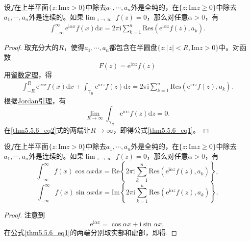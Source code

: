 \documentclass[../../main.tex]{subfiles}
\begin{document}
\begin{theorem}\label{theorem:定理5.5.6}
设$f$在上半平面$\{ z: \mathrm{Im} z > 0 \}$中除去$a_1, \cdots, a_n$外是全纯的，在$\{ z: \mathrm{Im} z \geqslant 0 \}$中除去$a_1, \cdots, a_n$外是连续的。如果$\lim_{\substack{z \to \infty}} f(z) = 0$，那么对任意$\alpha > 0$，有
\begin{align}
\int_{-\infty}^{\infty} \mathrm{e}^{\mathrm{i}\alpha x} f(x) \mathrm{d}x = 2\pi \mathrm{i} \sum_{k=1}^{n} \mathrm{Res}(\mathrm{e}^{\mathrm{i}\alpha z} f(z), a_k). \label{thm5.5.6_eq1}
\end{align}
\end{theorem}
\begin{proof}
取充分大的$R$，使得$a_1, \cdots, a_n$都包含在半圆盘$\{ z: |z| < R, \mathrm{Im} z > 0 \}$中。对函数
\[
F(z) = \mathrm{e}^{\mathrm{i}\alpha z} f(z)
\]
用\hyperref[theorem:留数定理(残数定理)-定理5.4.9]{留数定理}，得
\begin{align}
\int_{-R}^{R} \mathrm{e}^{\mathrm{i}\alpha x} f(x) \mathrm{d}x + \int_{\gamma_R} \mathrm{e}^{\mathrm{i}\alpha z} f(z) \mathrm{d}z = 2\pi \mathrm{i} \sum_{k=1}^{n} \mathrm{Res}(\mathrm{e}^{\mathrm{i}\alpha z} f(z), a_k). \label{thm5.5.6_eq2}
\end{align}
根据\hyperref[lemma:Jordan引理]{Jordan引理}，有
\[
\lim_{R \to \infty} \int_{\gamma_R} \mathrm{e}^{\mathrm{i}\alpha z} f(z) \mathrm{d}z = 0.
\]
在\eqref{thm5.5.6_eq2}式的两端让$R \to \infty$，即得公式\eqref{thm5.5.6_eq1}。

\end{proof}

\begin{corollary}\label{corollary:推论5.5.7}
设$f$在上半平面$\{ z: \mathrm{Im} z > 0 \}$中除去$a_1, \cdots, a_n$外是全纯的，在$\{ z: \mathrm{Im} z \geqslant 0 \}$中除去$a_1, \cdots, a_n$外是连续的。如果$\lim_{\substack{z \to \infty}} f(z) = 0$，那么对任意$\alpha > 0$，有
\[
\int_{-\infty}^{\infty} f(x) \cos\alpha x \mathrm{d}x = \mathrm{Re} \left\{ 2\pi \mathrm{i} \sum_{k=1}^{n} \mathrm{Res}(\mathrm{e}^{\mathrm{i}\alpha z} f(z), a_k) \right\},
\]
\[
\int_{-\infty}^{\infty} f(x) \sin\alpha x \mathrm{d}x = \mathrm{Im} \left\{ 2\pi \mathrm{i} \sum_{k=1}^{n} \mathrm{Res}(\mathrm{e}^{\mathrm{i}\alpha z} f(z), a_k) \right\}.
\]
\end{corollary}
\begin{proof}
注意到
\[
\mathrm{e}^{\mathrm{i}\alpha x} = \cos\alpha x + \mathrm{i}\sin\alpha x,
\]
在公式\eqref{thm5.5.6_eq1}的两端分别取实部和虚部，即得.

\end{proof}
\end{document}
